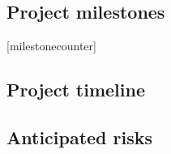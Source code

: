 \documentclass[../main.tex]{subfiles}
\begin{document}
\subsection{Project milestones}

[milestonecounter]
\newcommand\showmilestonecounter{%
    \stepcounter{milestonecounter}%
    \themilestonecounter%
}
\renewcommand{\thesubcounter}{%
    \stepcounter{subcounter}%
    \themilestonecounter.\arabic{subcounter}%
}

%  



\subsection{Project timeline}

% 



\subsection{Anticipated risks}
\end{document}
